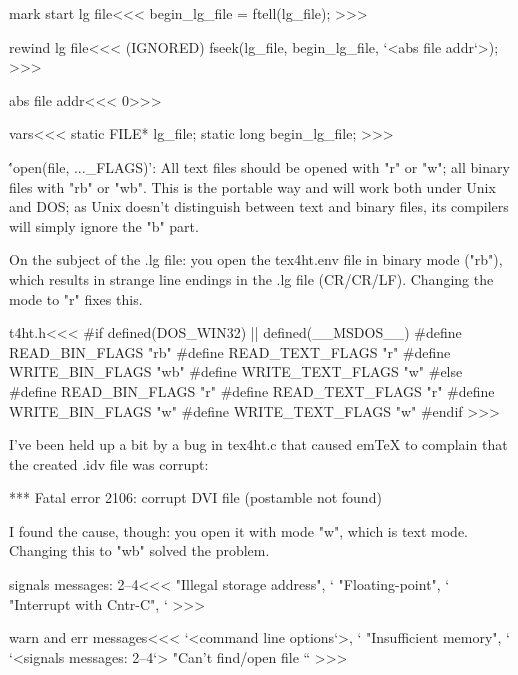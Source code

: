 {{{{{{{\<mark start lg file\><<<
begin_lg_file = ftell(lg_file);
>>>

\<rewind lg file\><<<
(IGNORED)  fseek(lg_file, begin_lg_file, `<abs file addr`>);
>>>

\<abs file addr\><<<
0>>>




\<vars\><<<
static FILE* lg_file;
static long  begin_lg_file;
>>>





\''open(file, ..._FLAGS)': All
text files should be opened with "r" or "w"; all binary files with "rb"
or "wb". This is the portable way and will work both under Unix and DOS;
as Unix doesn't distinguish between text and binary files, its compilers
will simply ignore the "b" part.

  On the subject of the .lg file: you open the tex4ht.env file in binary
mode ("rb"), which results in strange line endings in the .lg file
(CR/CR/LF). Changing the mode to "r" fixes this.


\<t4ht.h\><<<
#if defined(DOS_WIN32) || defined(__MSDOS__)
#define READ_BIN_FLAGS "rb"
#define READ_TEXT_FLAGS "r"
#define WRITE_BIN_FLAGS "wb"
#define WRITE_TEXT_FLAGS "w"
#else
#define READ_BIN_FLAGS "r"
#define READ_TEXT_FLAGS "r"
#define WRITE_BIN_FLAGS "w"
#define WRITE_TEXT_FLAGS "w"
#endif
>>>



\Verbatim
I've been held up a bit by a
bug in tex4ht.c that caused emTeX to complain that the created .idv file
was corrupt:

*** Fatal error 2106: corrupt DVI file (postamble not found)

  I found the cause, though: you open it with mode "w", which is text
mode. Changing this to "wb" solved the problem.
\EndVerbatim












\<signals messages: 2--4\><<<
"Illegal storage address\n", `%
"Floating-point\n",          `%
"Interrupt with Cntr-C\n",   `%
>>>

\<warn and err messages\><<<
`<command line options`>,                            `%
"Insufficient memory\n",                                `%
`<signals messages: 2--4`>
"Can't find/open file ``%
>>>



}}}}}}}

